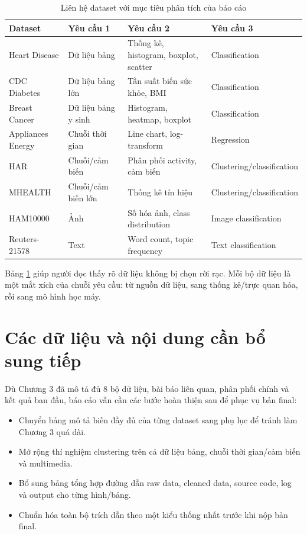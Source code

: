 \begin{table}[H]
\centering
\caption{Liên hệ dataset với mục tiêu phân tích của báo cáo}
\label{tab:chapter2_requirement_mapping}
\small
\begin{tabular}{p{}p{}p{}p{}}
\toprule
Dataset & Yêu cầu 1 & Yêu cầu 2 & Yêu cầu 3 \\
\midrule
Heart Disease & Dữ liệu bảng & Thống kê, histogram, boxplot, scatter & Classification \\
CDC Diabetes & Dữ liệu bảng lớn & Tần suất biến sức khỏe, BMI & Classification \\
Breast Cancer & Dữ liệu bảng y sinh & Histogram, heatmap, boxplot & Classification \\
Appliances Energy & Chuỗi thời gian & Line chart, log-transform & Regression \\
HAR & Chuỗi/cảm biến & Phân phối activity, cảm biến & Clustering/classification \\
MHEALTH & Chuỗi/cảm biến lớn & Thống kê tín hiệu & Clustering/classification \\
HAM10000 & Ảnh & Số hóa ảnh, class distribution & Image classification \\
Reuters-21578 & Text & Word count, topic frequency & Text classification \\
\bottomrule
\end{tabular}
\end{table}

Bảng \ref{tab:chapter2_requirement_mapping} giúp người đọc thấy rõ dữ liệu không bị chọn rời rạc. Mỗi bộ dữ liệu là một mắt xích của chuỗi yêu cầu: từ nguồn dữ liệu, sang thống kê/trực quan hóa, rồi sang mô hình học máy.

\section{Các dữ liệu và nội dung cần bổ sung tiếp}

Dù Chương 3 đã mô tả đủ 8 bộ dữ liệu, bài báo liên quan, phân phối chính và kết quả ban đầu, báo cáo vẫn cần các bước hoàn thiện sau để phục vụ bản final:

\begin{itemize}
 \item Chuyển bảng mô tả biến đầy đủ của từng dataset sang phụ lục để tránh làm Chương 3 quá dài.
 \item Mở rộng thí nghiệm clustering trên cả dữ liệu bảng, chuỗi thời gian/cảm biến và multimedia.
 \item Bổ sung bảng tổng hợp đường dẫn raw data, cleaned data, source code, log và output cho từng hình/bảng.
 \item Chuẩn hóa toàn bộ trích dẫn theo một kiểu thống nhất trước khi nộp bản final.
\end{itemize}

